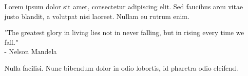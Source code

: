 \documentclass{article}
\renewenvironment{quote}{%
  \def\FrameCommand{{\color{mygray}\vrule width 3pt}\hspace{10pt}}%
  \MakeFramed {\advance\hsize-\width \FrameRestore}}%
{\endMakeFramed}
\begin{document}
Lorem ipsum dolor sit amet, consectetur adipiscing elit. Sed faucibus arcu vitae justo blandit, a volutpat nisi laoreet. Nullam eu rutrum enim.

\begin{quote}
    "The greatest glory in living lies not in never falling, but in rising every time we fall." \\
    - Nelson Mandela
\end{quote}

Nulla facilisi. Nunc bibendum dolor in odio lobortis, id pharetra odio eleifend. 
\end{document}
